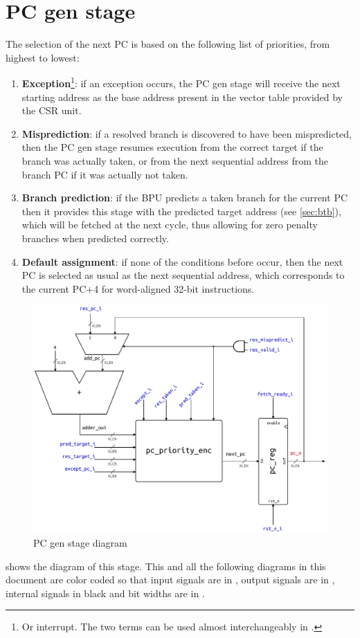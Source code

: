 \section{\acs{PC} gen stage}
The selection of the next \ac{PC} is based on the following list of priorities, from highest to lowest:
\begin{enumerate}
  \item \textbf{Exception}\footnote{Or interrupt. The two terms can be used almost interchangeably in \riscv.}: if an exception occurs, the \ac{PC} gen stage will receive the next starting address as the base address present in the vector table provided by the {\smaller CSR} unit.
  \item \textbf{Misprediction}: if a resolved branch is discovered to have been mispredicted, then the \ac{PC} gen stage resumes execution from the correct target if the branch was actually taken, or from the next sequential address from the branch \ac{PC} if it was actually not taken.
  \item \textbf{Branch prediction}: if the \ac{BPU} predicts a taken branch for the current \ac{PC} then it provides this stage with the predicted target address (see \cref{sec:btb}), which will be fetched at the next cycle, thus allowing for zero penalty branches when predicted correctly.
  \item \textbf{Default assignment}: if none of the conditions before occur, then the next \ac{PC} is selected as usual as the next sequential address, which corresponds to the current \ac{PC}+4 for word-aligned 32-bit instructions.
\end{enumerate}

\begin{figure}[hbt]
  \centering
  \includegraphics[width=\textwidth]{img/pc_gen_stage.pdf}
  \caption{\acs{PC} gen stage diagram}
  \label{fig:pc_gen_stage}
\end{figure}
 shows the diagram of this stage. This and all the following diagrams in this document are color coded so that input signals are in {\color{input_blue}{blue}}, output signals are in {\color{output_red}{red}}, internal signals in black and bit widths are in {\color{width_gray}{gray}}.

